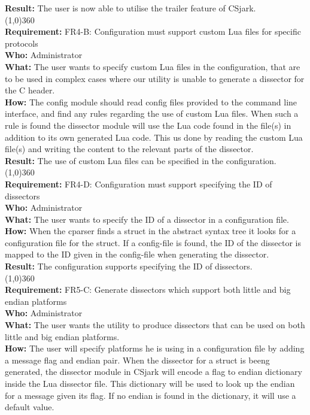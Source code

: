 \textbf{Result:} The user is now able to utilise the trailer feature of CSjark.\\
\line(1,0){360}\\
\textbf{Requirement:} FR4-B: Configuration must support custom Lua files for specific protocols\\
\textbf{Who:} Administrator\\
\textbf{What:} The user wants to specify custom Lua files in the configuration, that are to be used in complex cases where our utility is unable to generate a dissector for the C header.\\
\textbf{How:} The config module should read config files provided to the command line interface, and find any rules regarding the use of custom Lua files. When such a rule is found the dissector module will use the Lua code found in the file(s) in addition to its own generated Lua code.
This us done by reading the custom Lua file(s) and writing the content to the relevant parts of the dissector.\\
\textbf{Result:} The use of custom Lua files can be specified in the configuration.\\
\line(1,0){360}\\
\textbf{Requirement:} FR4-D: Configuration must support specifying the ID of dissectors \\
\textbf{Who:} Administrator\\
\textbf{What:} The user wants to specify the ID of a dissector in a configuration file.\\
\textbf{How:} When the cparser finds a struct in the abstract syntax tree it looks for a configuration file for the struct. If a config-file is found, the ID of the dissector is mapped to the ID given in the config-file when generating the dissector.\\
\textbf{Result:} The configuration supports specifying the ID of dissectors.\\
\line(1,0){360}\\
\textbf{Requirement:} FR5-C: Generate dissectors which support both little and big endian platforms\\
\textbf{Who:} Administrator\\
\textbf{What:} The user wants the utility to produce dissectors that can be used on both little and big endian platforms.\\
\textbf{How:} The user will specify platforms he is using in a configuration file by adding a message flag and endian pair. When the dissector for a struct is beeng generated, the dissector module in CSjark will encode a flag to endian dictionary inside the Lua dissector file. This dictionary will be used to look up the endian for a message given its flag. If no endian is found in the dictionary, it will use a default value.\\
